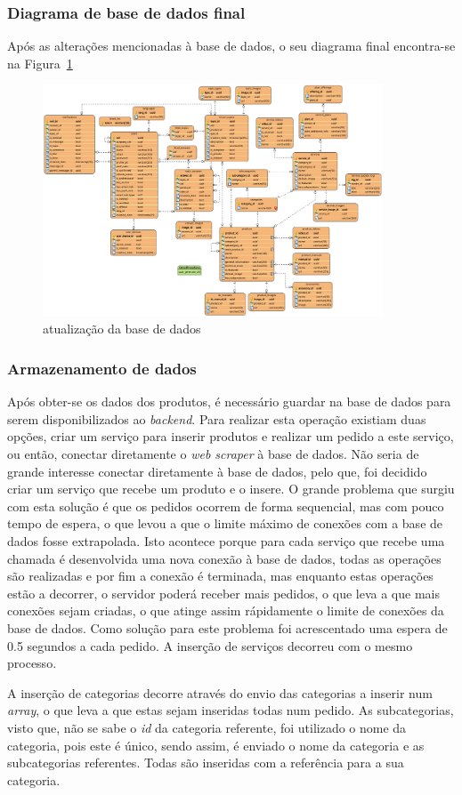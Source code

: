 \subsubsection{Diagrama de base de dados final}

Após as alterações mencionadas à base de dados, o seu diagrama final encontra-se na Figura~\ref{webscraper_bd}

\begin{figure}[htb]
  \centering
  \includegraphics[width=0.9\textwidth]{images/diagramas/bd_final.png}
  \caption{atualização da base de dados}
  \label{webscraper_bd}
\end{figure}


\subsubsection{Armazenamento de dados}

Após obter-se os dados dos produtos, é necessário guardar na base de dados para serem disponibilizados ao \textit{backend}. Para realizar esta operação existiam duas opções, criar um serviço para inserir produtos e realizar um pedido a este serviço, ou então, conectar diretamente o \textit{web scraper} à base de dados. Não seria de grande interesse conectar diretamente à base de dados, pelo que, foi decidido criar um serviço que recebe um produto e o insere. O grande problema que surgiu com esta solução é que os pedidos ocorrem de forma sequencial, mas com pouco tempo de espera, o que levou a que o limite máximo de conexões com a base de dados fosse extrapolada. Isto acontece porque para cada serviço que recebe uma chamada é desenvolvida uma nova conexão à base de dados, todas as operações são realizadas e por fim a conexão é terminada, mas enquanto estas operações estão a decorrer, o servidor poderá receber mais pedidos, o que leva a que mais conexões sejam criadas, o que atinge assim rápidamente o limite de conexões da base de dados. Como solução para este problema foi acrescentado uma espera de 0.5 segundos a cada pedido. A inserção de serviços decorreu com o mesmo processo.

A inserção de categorias decorre através do envio das categorias a inserir num \textit{array}, o que leva a que estas sejam inseridas todas num pedido. As subcategorias, visto que, não se sabe o \textit{id} da categoria referente, foi utilizado o nome da categoria, pois este é único, sendo assim, é enviado o nome da categoria e as subcategorias referentes. Todas são inseridas com a referência para a sua categoria.

